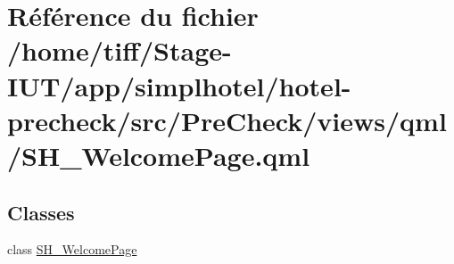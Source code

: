\hypertarget{SH__WelcomePage_8qml}{\section{Référence du fichier /home/tiff/\-Stage-\/\-I\-U\-T/app/simplhotel/hotel-\/precheck/src/\-Pre\-Check/views/qml/\-S\-H\-\_\-\-Welcome\-Page.qml}
\label{SH__WelcomePage_8qml}
}
\subsection*{Classes}
\begin{DoxyCompactItemize}
\item 
class \hyperlink{classSH__WelcomePage}{S\-H\-\_\-\-Welcome\-Page}
\end{DoxyCompactItemize}
